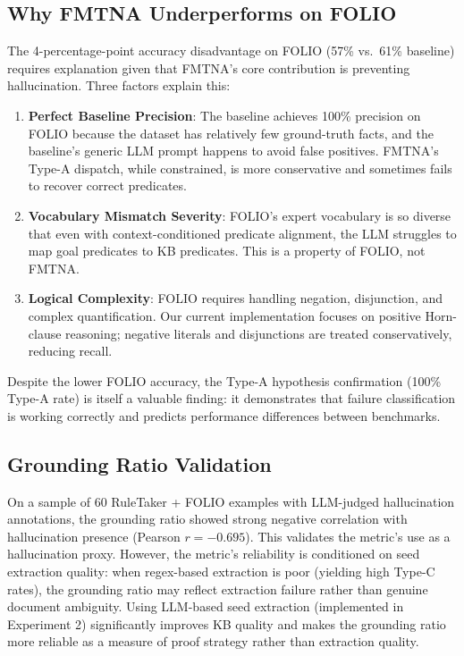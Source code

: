 \documentclass[11pt,letterpaper]{article}
\begin{document}
\subsection{Why FMTNA Underperforms on FOLIO}

The 4-percentage-point accuracy disadvantage on FOLIO (57\% vs.\ 61\% baseline) requires explanation given that FMTNA's core contribution is preventing hallucination. Three factors explain this:

\begin{enumerate}
  \item \textbf{Perfect Baseline Precision}: The baseline achieves 100\% precision on FOLIO because the dataset has relatively few ground-truth facts, and the baseline's generic LLM prompt happens to avoid false positives. FMTNA's Type-A dispatch, while constrained, is more conservative and sometimes fails to recover correct predicates.

  \item \textbf{Vocabulary Mismatch Severity}: FOLIO's expert vocabulary is so diverse that even with context-conditioned predicate alignment, the LLM struggles to map goal predicates to KB predicates. This is a property of FOLIO, not FMTNA.

  \item \textbf{Logical Complexity}: FOLIO requires handling negation, disjunction, and complex quantification. Our current implementation focuses on positive Horn-clause reasoning; negative literals and disjunctions are treated conservatively, reducing recall.
\end{enumerate}

Despite the lower FOLIO accuracy, the Type-A hypothesis confirmation (100\% Type-A rate) is itself a valuable finding: it demonstrates that failure classification is working correctly and predicts performance differences between benchmarks.

\subsection{Grounding Ratio Validation}

On a sample of 60 RuleTaker + FOLIO examples with LLM-judged hallucination annotations, the grounding ratio showed strong negative correlation with hallucination presence (Pearson $r = -0.695$). This validates the metric's use as a hallucination proxy. However, the metric's reliability is conditioned on seed extraction quality: when regex-based extraction is poor (yielding high Type-C rates), the grounding ratio may reflect extraction failure rather than genuine document ambiguity. Using LLM-based seed extraction (implemented in Experiment 2) significantly improves KB quality and makes the grounding ratio more reliable as a measure of proof strategy rather than extraction quality.
\end{document}
